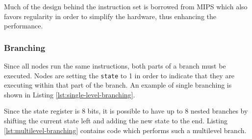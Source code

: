 Much of the design behind the instruction set is borrowed from \ac{MIPS} which also 
favors regularity in order to simplify the hardware, thus enhancing the performance.

\subsubsection{Branching}
Since all nodes run the same instructions, both parts of a branch must be
executed. Nodes are setting the {\tt state} to 1 in order to indicate that they
are executing within that part of the branch. An example of single branching is
shown in Listing \ref{lst:single-level-branching}.



Since the state register is 8 bits, it is possible to have up to 8 nested
branches by shifting the current state left and adding the new state to the
end. Listing \ref{lst:multilevel-branching} contains code which performs such a
multilevel branch.



